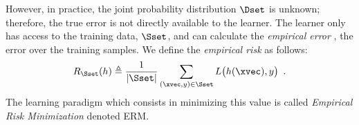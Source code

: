 However, in practice, the joint probability distribution $\Dset$ is unknown; therefore, the true error is not directly available to the learner.
The learner only has access to the training data, $\Sset$, and can calculate the \emph{empirical error} \ie, the error over the training samples.
We define the \emph{empirical risk} as follows:
\begin{equation} \label{equation:ch2-empirical_risk}
  R_{\Sset}(h) \triangleq \frac{1}{|\Sset|} \sum_{(\xvec, y) \in \Sset} L\big( h(\xvec), y \big) \enspace.
\end{equation}
The learning paradigm which consists in minimizing this value is called \emph{Empirical Risk Minimization} denoted ERM.





